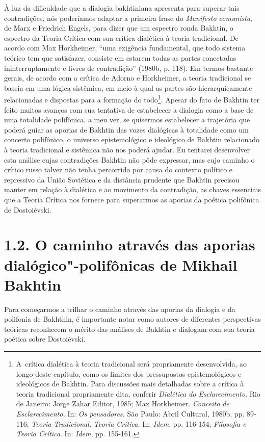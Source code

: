 À luz da dificuldade que a dialogia bakhtiniana apresenta para superar
tais contradições, nós poderíamos adaptar a primeira frase do
\emph{Manifesto comunista}, de Marx e Friedrich Engels, para dizer que
um espectro ronda Bakhtin, o espectro da Teoria Crítica com sua crítica
dialética à teoria tradicional. De acordo com Max Horkheimer, ``uma
exigência fundamental, que todo sistema teórico tem que satisfazer,
consiste em estarem todas as partes conectadas ininterruptamente e
livres de contradição'' (1980b, p. 118). Em termos bastante gerais, de
acordo com a crítica de Adorno e Horkheimer, a teoria tradicional se
baseia em uma lógica sistêmica, em meio à qual as partes são
hierarquicamente relacionadas e dispostas para a formação do
todo\footnote{A~crítica dialética à teoria tradicional será propriamente
  desenvolvida, ao longo deste capítulo, como os limites dos
  pressupostos epistemológicos e ideológicos de Bakhtin. Para discussões
  mais detalhadas sobre a crítica à teoria tradicional propriamente
  dita, conferir \emph{Dialética do Esclarecimento}. Rio de Janeiro:
  Jorge Zahar Editor, 1985; Max Horkheimer. \emph{Conceito de
  Esclarecimento.} In: \emph{Os pensadores.} São Paulo: Abril Cultural,
  1980b, pp. 89-116; \emph{Teoria Tradicional, Teoria Crítica.} In:
  \emph{Idem}, pp. 116-154; \emph{Filosofia e Teoria Crítica}. In:
  \emph{Idem}, pp. 155-161.}. Apesar do fato de Bakhtin ter feito muitos
avanços com sua tentativa de estabelecer a dialogia como a base de uma
totalidade polifônica, a meu ver, se quisermos estabelecer a trajetória
que poderá guiar as aporias de Bakhtin das vozes dialógicas à totalidade
como um concerto polifônico, o universo epistemológico e ideológico de
Bakhtin relacionado à teoria tradicional e sistêmica não nos poderá
ajudar. Eu tentarei desenvolver esta análise cujas contradições Bakhtin
não pôde expressar, mas cujo caminho o crítico russo talvez não tenha
percorrido por causa do contexto político e repressivo da União
Soviética e da distância prudente que Bakhtin precisou manter em relação
à dialética e ao movimento da contradição, as chaves essenciais que a
Teoria Crítica nos fornece para superarmos as aporias da poética
polifônica de Dostoiévski.

\section{1.2. O caminho através das aporias dialógico"-polifônicas de Mikhail
Bakhtin}

Para começarmos a trilhar o caminho através das aporias da dialogia e da
polifonia de Bakhthin, é importante notar como autores de diferentes
perspectivas teóricas reconhecem o mérito das análises de Bakhtin e
dialogam com sua teoria poética sobre Dostoiévski.

